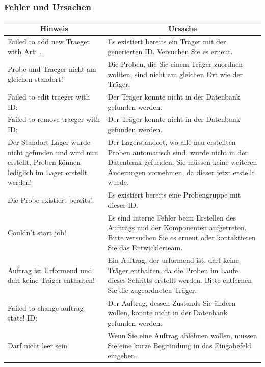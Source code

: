 \documentclass[enabledeprecatedfontcommands,fontsize=12pt,paper=a4,twoside]{scrartcl}
\begin{document}
\subsubsection{Fehler und Ursachen}
\begin{longtable}[c]{|p{5cm}|p{10cm}|}
\hline
\multicolumn{1}{|c|}{\textbf{Hinweis}}                          & \multicolumn{1}{c|}{\textbf{Ursache}}                                                                                                                                                                                                               \\ \hline
\endhead
Failed to add new Traeger with Art: .. & Es existiert bereits ein Träger mit der generierten ID. Versuchen Sie es erneut. \\ \hline
Probe und Traeger nicht am gleichen standort!& Die Proben, die Sie einem Träger zuordnen wollten, sind nicht am gleichen Ort wie der Träger.\\ \hline
Failed to edit traeger with ID:  & Der Träger konnte nicht in der Datenbank gefunden werden. \\ \hline
Failed to remove traeger with ID: & Der Träger konnte nicht in der Datenbank gefunden werden. \\ \hline
Der Standort Lager wurde nicht gefunden und wird nun erstellt, Proben können lediglich im Lager erstellt werden! & Der Lagerstandort, wo alle neu erstellten Proben automatisch sind, wurde nicht in der Datenbank gefunden. Sie müssen keine weiteren Änderungen vornehmen, da dieser jetzt erstellt wurde.  \\ \hline
Die Probe existiert bereits!:  & Es existiert bereits eine Probengruppe mit dieser ID.  \\ \hline
Couldn't start job!& Es sind interne Fehler beim Erstellen des Auftrags und der Komponenten aufgetreten. Bitte versuchen Sie es erneut oder kontaktieren Sie das Entwicklerteam. \\ \hline
Auftrag ist Urformend und darf keine Träger enthalten! & Ein Auftrag, der urformend ist, darf keine Träger enthalten, da die Proben im Laufe dieses Schritts erstellt werden. Bitte entfernen Sie die zugeordneten Träger. \\ \hline
Failed to change auftrag state! ID:  & Der Auftrag, dessen Zustands Sie ändern wollen, konnte nicht in der Datenbank gefunden werden. \\ \hline
Darf nicht leer sein & Wenn Sie eine Auftrag ablehnen wollen, müssen Sie eine kurze Begründung in das Eingabefeld eingeben.  \\ \hline

\end{longtable}
\end{document}
